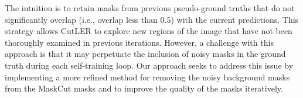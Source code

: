 The intuition is to retain masks from previous pseudo-ground truths that do not significantly overlap (i.e., overlap less than 0.5) with the current predictions. This strategy allows CutLER to explore new regions of the image that have not been thoroughly examined in previous iterations. However, a challenge with this approach is that it may perpetuate the inclusion of noisy masks in the ground truth during each self-training loop. Our approach seeks to address this issue by implementing a more refined method for removing the noisy background masks from the MaskCut masks and to improve the quality of the masks iteratively.